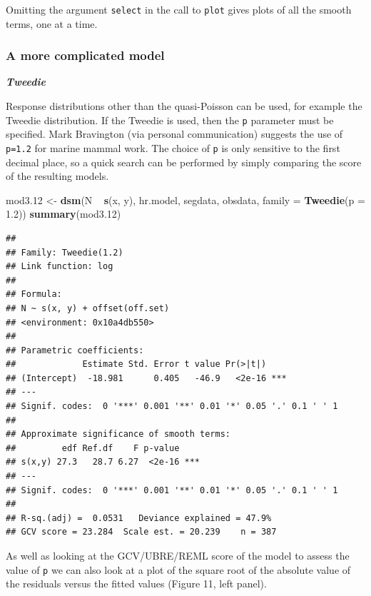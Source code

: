 \documentclass[]{amsart}
\newenvironment{Shaded}{}{}
\newcommand{\KeywordTok}[1]{\textcolor[rgb]{0.00,0.44,0.13}{\textbf{{#1}}}}
\newcommand{\DataTypeTok}[1]{\textcolor[rgb]{0.56,0.13,0.00}{{#1}}}
\newcommand{\FloatTok}[1]{\textcolor[rgb]{0.25,0.63,0.44}{{#1}}}
\newcommand{\StringTok}[1]{\textcolor[rgb]{0.25,0.44,0.63}{{#1}}}
\newcommand{\NormalTok}[1]{{#1}}
\begin{document}
Omitting the argument \texttt{select} in the call to \texttt{plot} gives
plots of all the smooth terms, one at a time.

\subsubsection{A more complicated model}

\textbf{\emph{Tweedie}}

Response distributions other than the quasi-Poisson can be used, for
example the Tweedie distribution. If the Tweedie is used, then the
\texttt{p} parameter must be specified. Mark Bravington (via personal
communication) suggests the use of \texttt{p=1.2} for marine mammal
work. The choice of \texttt{p} is only sensitive to the first decimal
place, so a quick search can be performed by simply comparing the score
of the resulting models.

\begin{Shaded}
\begin{Highlighting}[]
\NormalTok{mod3}\FloatTok{.12} \NormalTok{<-}\StringTok{ }\KeywordTok{dsm}\NormalTok{(N ~}\StringTok{ }\KeywordTok{s}\NormalTok{(x, y), hr.model, segdata, obsdata, }\DataTypeTok{family =} \KeywordTok{Tweedie}\NormalTok{(}\DataTypeTok{p =} \FloatTok{1.2}\NormalTok{))}
\KeywordTok{summary}\NormalTok{(mod3}\FloatTok{.12}\NormalTok{)}
\end{Highlighting}
\end{Shaded}

\begin{verbatim}
## 
## Family: Tweedie(1.2) 
## Link function: log 
## 
## Formula:
## N ~ s(x, y) + offset(off.set)
## <environment: 0x10a4db550>
## 
## Parametric coefficients:
##             Estimate Std. Error t value Pr(>|t|)    
## (Intercept)  -18.981      0.405   -46.9   <2e-16 ***
## ---
## Signif. codes:  0 '***' 0.001 '**' 0.01 '*' 0.05 '.' 0.1 ' ' 1
## 
## Approximate significance of smooth terms:
##         edf Ref.df    F p-value    
## s(x,y) 27.3   28.7 6.27  <2e-16 ***
## ---
## Signif. codes:  0 '***' 0.001 '**' 0.01 '*' 0.05 '.' 0.1 ' ' 1
## 
## R-sq.(adj) =  0.0531   Deviance explained = 47.9%
## GCV score = 23.284  Scale est. = 20.239    n = 387
\end{verbatim}

As well as looking at the GCV/UBRE/REML score of the model to assess the
value of \texttt{p} we can also look at a plot of the square root of the
absolute value of the residuals versus the fitted values (Figure 11,
left panel).
\end{document}
